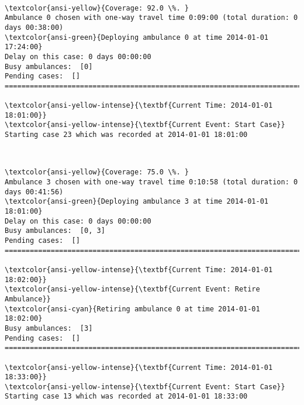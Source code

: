 \documentclass[11pt]{article}
\begin{document}
    \begin{center}
    \end{center}
    { \hspace*{\fill} \\}
    
    \begin{Verbatim}[commandchars=\\\{\}]
\textcolor{ansi-yellow}{Coverage: 92.0 \%. }
Ambulance 0 chosen with one-way travel time 0:09:00 (total duration: 0 days 00:38:00)
\textcolor{ansi-green}{Deploying ambulance 0 at time 2014-01-01 17:24:00}
Delay on this case: 0 days 00:00:00
Busy ambulances:  [0]
Pending cases:  []
========================================================================

\textcolor{ansi-yellow-intense}{\textbf{Current Time: 2014-01-01 18:01:00}}
\textcolor{ansi-yellow-intense}{\textbf{Current Event: Start Case}}
Starting case 23 which was recorded at 2014-01-01 18:01:00

    \end{Verbatim}

    \begin{center}
    \end{center}
    { \hspace*{\fill} \\}
    
    \begin{Verbatim}[commandchars=\\\{\}]
\textcolor{ansi-yellow}{Coverage: 75.0 \%. }
Ambulance 3 chosen with one-way travel time 0:10:58 (total duration: 0 days 00:41:56)
\textcolor{ansi-green}{Deploying ambulance 3 at time 2014-01-01 18:01:00}
Delay on this case: 0 days 00:00:00
Busy ambulances:  [0, 3]
Pending cases:  []
========================================================================

\textcolor{ansi-yellow-intense}{\textbf{Current Time: 2014-01-01 18:02:00}}
\textcolor{ansi-yellow-intense}{\textbf{Current Event: Retire Ambulance}}
\textcolor{ansi-cyan}{Retiring ambulance 0 at time 2014-01-01 18:02:00}
Busy ambulances:  [3]
Pending cases:  []
========================================================================

\textcolor{ansi-yellow-intense}{\textbf{Current Time: 2014-01-01 18:33:00}}
\textcolor{ansi-yellow-intense}{\textbf{Current Event: Start Case}}
Starting case 13 which was recorded at 2014-01-01 18:33:00

    \end{Verbatim}
\end{document}

